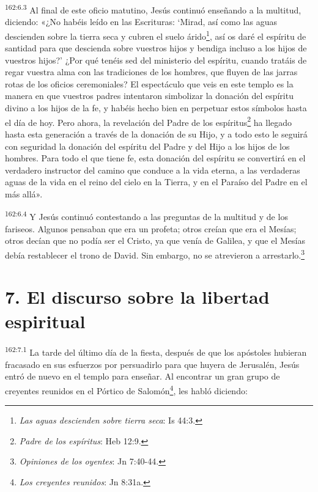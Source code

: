 \par 
\textsuperscript{162:6.3} Al final de este oficio matutino, Jesús continuó enseñando a la multitud, diciendo: «¿No habéis leído en las Escrituras: `Mirad, así como las aguas descienden sobre la tierra seca y cubren el suelo árido\footnote{\textit{Las aguas descienden sobre tierra seca}: Is 44:3.}, así os daré el espíritu de santidad para que descienda sobre vuestros hijos y bendiga incluso a los hijos de vuestros hijos?' ¿Por qué tenéis sed del ministerio del espíritu, cuando tratáis de regar vuestra alma con las tradiciones de los hombres, que fluyen de las jarras rotas de los oficios ceremoniales? El espectáculo que veis en este templo es la manera en que vuestros padres intentaron simbolizar la donación del espíritu divino a los hijos de la fe, y habéis hecho bien en perpetuar estos símbolos hasta el día de hoy. Pero ahora, la revelación del Padre de los espíritus\footnote{\textit{Padre de los espíritus}: Heb 12:9.} ha llegado hasta esta generación a través de la donación de su Hijo, y a todo esto le seguirá con seguridad la donación del espíritu del Padre y del Hijo a los hijos de los hombres. Para todo el que tiene fe, esta donación del espíritu se convertirá en el verdadero instructor del camino que conduce a la vida eterna, a las verdaderas aguas de la vida en el reino del cielo en la Tierra, y en el Paraíso del Padre en el más allá».

\par 
\textsuperscript{162:6.4} Y Jesús continuó contestando a las preguntas de la multitud y de los fariseos. Algunos pensaban que era un profeta; otros creían que era el Mesías; otros decían que no podía ser el Cristo, ya que venía de Galilea, y que el Mesías debía restablecer el trono de David. Sin embargo, no se atrevieron a arrestarlo.\footnote{\textit{Opiniones de los oyentes}: Jn 7:40-44.}

\section*{7. El discurso sobre la libertad espiritual}
\par 
\textsuperscript{162:7.1} La tarde del último día de la fiesta, después de que los apóstoles hubieran fracasado en sus esfuerzos por persuadirlo para que huyera de Jerusalén, Jesús entró de nuevo en el templo para enseñar. Al encontrar un gran grupo de creyentes reunidos en el Pórtico de Salomón\footnote{\textit{Los creyentes reunidos}: Jn 8:31a.}, les habló diciendo:


